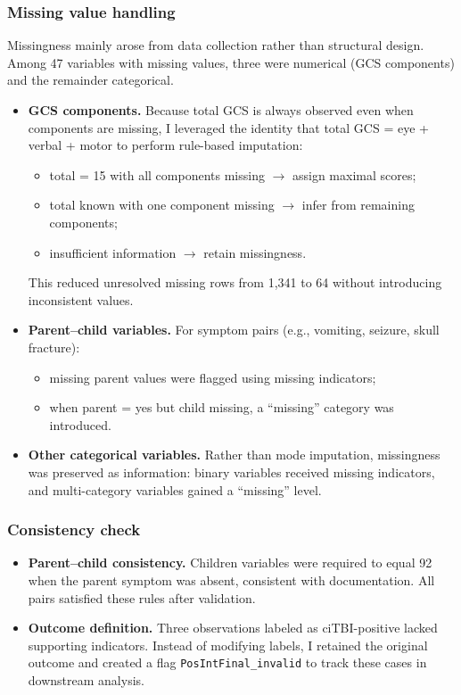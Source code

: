 \documentclass[10pt,letterpaper]{article}
\begin{document}
\subsubsection{Missing value handling}

Missingness mainly arose from data collection rather than structural design. 
Among 47 variables with missing values, three were numerical (GCS components) and the remainder categorical.

\begin{itemize}
\item \textbf{GCS components.} Because total GCS is always observed even when components are missing,
I leveraged the identity that total GCS = eye + verbal + motor 
to perform rule-based imputation:
\begin{itemize}
\item total = 15 with all components missing $\rightarrow$ assign maximal scores;
\item total known with one component missing $\rightarrow$ infer from remaining components;
\item insufficient information $\rightarrow$ retain missingness.
\end{itemize}
This reduced unresolved missing rows from 1,341 to 64 without introducing inconsistent values.

\item \textbf{Parent--child variables.}
For symptom pairs (e.g., vomiting, seizure, skull fracture):
\begin{itemize}
\item missing parent values were flagged using missing indicators;
\item when parent = yes but child missing, a ``missing'' category was introduced.
\end{itemize}

\item \textbf{Other categorical variables.}
Rather than mode imputation, missingness was preserved as information:
binary variables received missing indicators, and multi-category variables gained a ``missing'' level.
\end{itemize}

\subsubsection{Consistency check}

\begin{itemize}
\item \textbf{Parent--child consistency.}
Children variables were required to equal 92 when the parent symptom was absent, consistent with documentation. All pairs satisfied these rules after validation.

\item \textbf{Outcome definition.}
Three observations labeled as ciTBI-positive lacked supporting indicators. 
Instead of modifying labels, I retained the original outcome and created a flag 
\texttt{PosIntFinal\_invalid} to track these cases in downstream analysis.
\end{itemize}
\end{document}
